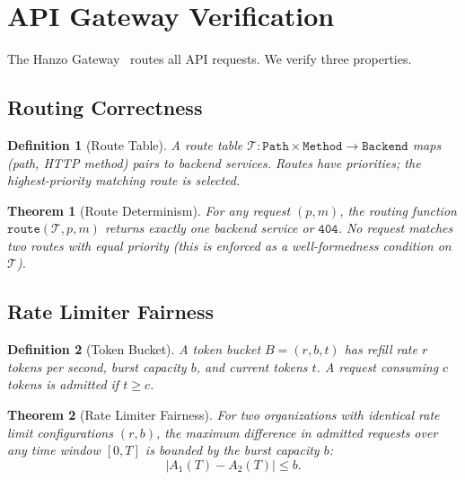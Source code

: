 \documentclass[11pt]{article}
\newtheorem{theorem}{Theorem}
\newtheorem{definition}{Definition}
\begin{document}
\section{API Gateway Verification}
\label{sec:gateway}

The Hanzo Gateway~\cite{hanzogateway} routes all API requests. We verify three
properties.

\subsection{Routing Correctness}

\begin{definition}[Route Table]
A route table $\mathcal{T}: \texttt{Path} \times \texttt{Method} \to
\texttt{Backend}$ maps (path, HTTP method) pairs to backend services.
Routes have priorities; the highest-priority matching route is selected.
\end{definition}

\begin{theorem}[Route Determinism]
For any request $(p, m)$, the routing function $\texttt{route}(\mathcal{T},
p, m)$ returns exactly one backend service or $\texttt{404}$. No request
matches two routes with equal priority (this is enforced as a well-formedness
condition on $\mathcal{T}$).
\end{theorem}

\subsection{Rate Limiter Fairness}

\begin{definition}[Token Bucket]
A token bucket $B = (r, b, t)$ has refill rate $r$ tokens per second, burst
capacity $b$, and current tokens $t$. A request consuming $c$ tokens is
admitted if $t \geq c$.
\end{definition}

\begin{theorem}[Rate Limiter Fairness]
For two organizations with identical rate limit configurations $(r, b)$, the
maximum difference in admitted requests over any time window $[0, T]$ is
bounded by the burst capacity $b$:
\begin{equation}
|A_1(T) - A_2(T)| \leq b.
\end{equation}
\end{theorem}
\end{document}
